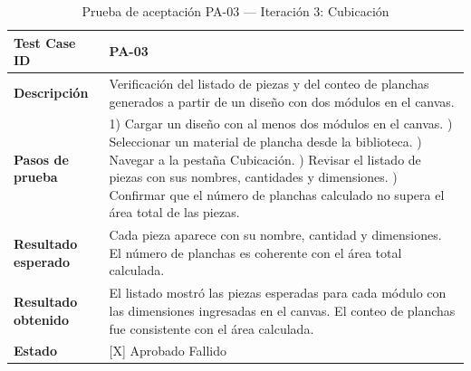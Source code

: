 ﻿\documentclass{iccmemoria}
\begin{document}
\begin{table}[H]
\centering
\caption{Prueba de aceptación PA-03 — Iteración 3: Cubicación}
\label{tab:pa03}
\begin{tabular}{|p{4cm}|p{9.5cm}|}
\hline
\textbf{Test Case ID} & PA-03 \\
\hline
\textbf{Descripción} & Verificación del listado de piezas y del conteo de planchas generados a partir de un diseño con dos módulos en el canvas. \\
\hline
\textbf{Pasos de prueba} &
1) Cargar un diseño con al menos dos módulos en el canvas. \newline
2) Seleccionar un material de plancha desde la biblioteca. \newline
3) Navegar a la pestaña Cubicación. \newline
4) Revisar el listado de piezas con sus nombres, cantidades y dimensiones. \newline
5) Confirmar que el número de planchas calculado no supera el área total de las piezas. \\
\hline
\textbf{Resultado esperado} & Cada pieza aparece con su nombre, cantidad y dimensiones. El número de planchas es coherente con el área total calculada. \\
\hline
\textbf{Resultado obtenido} & El listado mostró las piezas esperadas para cada módulo con las dimensiones ingresadas en el canvas. El conteo de planchas fue consistente con el área calculada. \\
\hline
\textbf{Estado} & {[X]} Aprobado \quad {[ ]} Fallido \\
\hline
\end{tabular}
\end{table}
\end{document}

